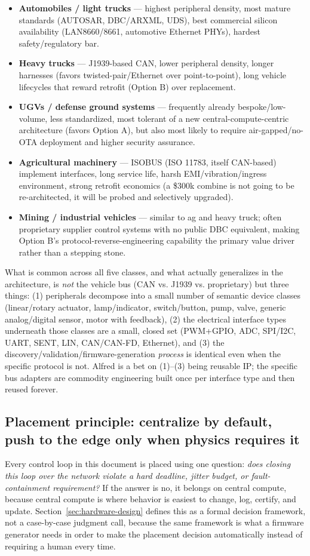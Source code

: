 \begin{itemize}
\item \textbf{Automobiles / light trucks} --- highest peripheral density, most mature standards (AUTOSAR, DBC/ARXML, UDS), best commercial silicon availability (LAN8660/8661, automotive Ethernet PHYs), hardest safety/regulatory bar.
\item \textbf{Heavy trucks} --- J1939-based CAN, lower peripheral density, longer harnesses (favors twisted-pair/Ethernet over point-to-point), long vehicle lifecycles that reward retrofit (Option B) over replacement.
\item \textbf{UGVs / defense ground systems} --- frequently already bespoke/low-volume, less standardized, most tolerant of a new central-compute-centric architecture (favors Option A), but also most likely to require air-gapped/no-OTA deployment and higher security assurance.
\item \textbf{Agricultural machinery} --- ISOBUS (ISO 11783, itself CAN-based) implement interfaces, long service life, harsh EMI/vibration/ingress environment, strong retrofit economics (a \$300k combine is not going to be re-architected, it will be probed and selectively upgraded).
\item \textbf{Mining / industrial vehicles} --- similar to ag and heavy truck; often proprietary supplier control systems with no public DBC equivalent, making Option B's protocol-reverse-engineering capability the primary value driver rather than a stepping stone.
\end{itemize}

What is common across all five classes, and what actually generalizes in the architecture, is \emph{not} the vehicle bus (CAN vs. J1939 vs. proprietary) but three things: (1) peripherals decompose into a small number of semantic device classes (linear/rotary actuator, lamp/indicator, switch/button, pump, valve, generic analog/digital sensor, motor with feedback), (2) the electrical interface types underneath those classes are a small, closed set (PWM+GPIO, ADC, SPI/I2C, UART, SENT, LIN, CAN/CAN-FD, Ethernet), and (3) the discovery/validation/firmware-generation \emph{process} is identical even when the specific protocol is not. Alfred is a bet on (1)--(3) being reusable IP; the specific bus adapters are commodity engineering built once per interface type and then reused forever.

\subsection{Placement principle: centralize by default, push to the edge only when physics requires it}

Every control loop in this document is placed using one question: \emph{does closing this loop over the network violate a hard deadline, jitter budget, or fault-containment requirement?} If the answer is no, it belongs on central compute, because central compute is where behavior is easiest to change, log, certify, and update. Section~\ref{sec:hardware-design} defines this as a formal decision framework, not a case-by-case judgment call, because the same framework is what a firmware generator needs in order to make the placement decision automatically instead of requiring a human every time.
